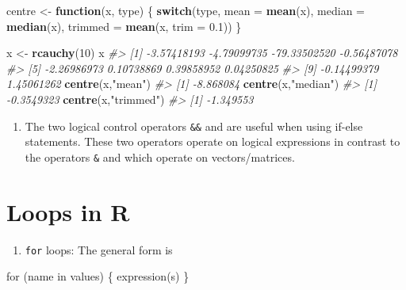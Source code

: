 \documentclass[
]{book}
\newenvironment{Shaded}{\begin{snugshade}}{\end{snugshade}}
\newcommand{\AttributeTok}[1]{\textcolor[rgb]{0.13,0.29,0.53}{#1}}
\newcommand{\CommentTok}[1]{\textcolor[rgb]{0.56,0.35,0.01}{\textit{#1}}}
\newcommand{\ControlFlowTok}[1]{\textcolor[rgb]{0.13,0.29,0.53}{\textbf{#1}}}
\newcommand{\DecValTok}[1]{\textcolor[rgb]{0.00,0.00,0.81}{#1}}
\newcommand{\FloatTok}[1]{\textcolor[rgb]{0.00,0.00,0.81}{#1}}
\newcommand{\FunctionTok}[1]{\textcolor[rgb]{0.13,0.29,0.53}{\textbf{#1}}}
\newcommand{\NormalTok}[1]{#1}
\newcommand{\OtherTok}[1]{\textcolor[rgb]{0.56,0.35,0.01}{#1}}
\newcommand{\StringTok}[1]{\textcolor[rgb]{0.31,0.60,0.02}{#1}}
\providecommand{\tightlist}{%
  \setlength{\itemsep}{0pt}\setlength{\parskip}{0pt}}
\begin{document}
\begin{Shaded}
\begin{Highlighting}[]
\NormalTok{centre }\OtherTok{\textless{}{-}} \ControlFlowTok{function}\NormalTok{(x, type) }
\NormalTok{  \{ }\ControlFlowTok{switch}\NormalTok{(type,}
           \AttributeTok{mean =} \FunctionTok{mean}\NormalTok{(x),}
           \AttributeTok{median =} \FunctionTok{median}\NormalTok{(x),}
           \AttributeTok{trimmed =} \FunctionTok{mean}\NormalTok{(x, }\AttributeTok{trim =} \FloatTok{0.1}\NormalTok{))}
\NormalTok{  \}}

\NormalTok{x }\OtherTok{\textless{}{-}} \FunctionTok{rcauchy}\NormalTok{(}\DecValTok{10}\NormalTok{)}
\NormalTok{x}
\CommentTok{\#\textgreater{}  [1]  {-}3.57418193  {-}4.79099735 {-}79.33502520  {-}0.56487078}
\CommentTok{\#\textgreater{}  [5]  {-}2.26986973   0.10738869   0.39858952   0.04250825}
\CommentTok{\#\textgreater{}  [9]  {-}0.14499379   1.45061262}
\FunctionTok{centre}\NormalTok{(x,}\StringTok{"mean"}\NormalTok{)}
\CommentTok{\#\textgreater{} [1] {-}8.868084}
\FunctionTok{centre}\NormalTok{(x,}\StringTok{"median"}\NormalTok{)}
\CommentTok{\#\textgreater{} [1] {-}0.3549323}
\FunctionTok{centre}\NormalTok{(x,}\StringTok{"trimmed"}\NormalTok{)}
\CommentTok{\#\textgreater{} [1] {-}1.349553}
\end{Highlighting}
\end{Shaded}

\begin{enumerate}
\def\labelenumi{(\alph{enumi})}
\setcounter{enumi}{7}
\tightlist
\item
  The two logical control operators \texttt{\&\&} and \texttt{\textbar{}\textbar{}} are useful when using if-else statements. These two operators operate on logical expressions in contrast to the operators \texttt{\&} and \texttt{\textbar{}} which operate on vectors/matrices.
\end{enumerate}

\section{Loops in R}\label{loops-in-r}

\begin{enumerate}
\def\labelenumi{(\alph{enumi})}
\tightlist
\item
  \texttt{for} loops: The general form is
\end{enumerate}

\begin{Shaded}
\begin{Highlighting}[]
\NormalTok{for (name in values)}
\NormalTok{      \{ expression(s)}
\NormalTok{      \}}
\end{Highlighting}
\end{Shaded}
\end{document}
